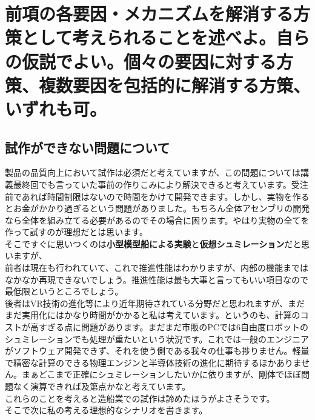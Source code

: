 \documentclass[dvipdfmx,a4paper]{jsarticle}
\begin{document}
\section{前項の各要因・メカニズムを解消する方策として考えられることを述べよ。自らの仮説でよい。個々の要因に対する方策、複数要因を包括的に解消する方策、いずれも可。}

\subsection{試作ができない問題について}
製品の品質向上において試作は必須だと考えていますが、この問題については講義最終回でも言っていた事前の作りこみにより解決できると考えています。受注前であれば時間制限はないので時間をかけて開発できます。しかし、実物を作るとお金がかかり過ぎるという問題がありました。もちろん全体アセンブリの開発なら全体を組み立てる必要があるのでその場合に困ります。やはり実物の全てを作って試すのが理想だとは思います。\\
そこですぐに思いつくのは\textbf{小型模型船による実験}と\textbf{仮想シュミレーション}だと思いますが、\\
前者は現在も行われていて、これで推進性能はわかりますが、内部の機能まではなかなか再現できないでしょう。推進性能は最も大事と言ってもいい項目なので最低限というところでしょう。\\
後者はVR技術の進化等により近年期待されている分野だと思われますが、まだまだ実用化にはかなり時間がかかると私は考えています。というのも、計算のコストが高すぎる点に問題があります。まだまだ市販のPCでは6自由度ロボットのシュミレーションでも処理が重たいという状況です。これでは一般のエンジニアがソフトウェア開発できず、それを使う側である我々の仕事も捗りません。軽量で精密な計算のできる物理エンジンと半導体技術の進化に期待するほかありません。まぁどこまで正確にシュミレーションしたいかに依りますが、剛体でほぼ問題なく演算できれば及第点かなと考えています。\\

これらのことを考えると造船業での試作は諦めたほうがよさそうです。\\
そこで次に私の考える理想的なシナリオを書きます。
\end{document}
